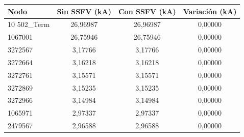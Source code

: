 \begin{tabular}{lccc}
\toprule
\textbf{Nodo} & \textbf{Sin SSFV (kA)} & \textbf{Con SSFV (kA)} & \textbf{Variación (kA)} \\
\midrule
10 502\_Term & 26,96987 & 26,96987 & 0,00000 \\
1067001 & 26,75946 & 26,75946 & 0,00000 \\
3272567 & 3,17766 & 3,17766 & 0,00000 \\
3272664 & 3,16218 & 3,16218 & 0,00000 \\
3272761 & 3,15571 & 3,15571 & 0,00000 \\
3272869 & 3,15235 & 3,15235 & 0,00000 \\
3272966 & 3,14984 & 3,14984 & 0,00000 \\
1065971 & 2,97337 & 2,97337 & 0,00000 \\
2479567 & 2,96588 & 2,96588 & 0,00000 \\
\bottomrule
\end{tabular}

